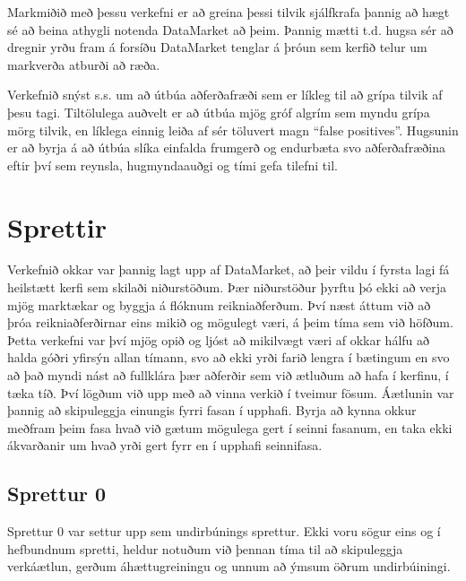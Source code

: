 \documentclass{article}
\begin{document}
Markmiðið með þessu verkefni er að greina þessi tilvik
sjálfkrafa þannig að hægt sé að beina athygli notenda
DataMarket að þeim. Þannig mætti t.d. hugsa sér að
dregnir yrðu fram á forsíðu DataMarket tenglar á þróun
sem kerfið telur um markverða atburði að ræða.

Verkefnið snýst s.s. um að útbúa aðferðafræði sem er
líkleg til að grípa tilvik af þesu tagi. Tiltölulega
auðvelt er að útbúa mjög gróf algrím sem myndu grípa
mörg tilvik, en líklega einnig leiða af sér töluvert
magn “false positives”. Hugsunin er að byrja á að útbúa
slíka einfalda frumgerð og endurbæta svo aðferðafræðina
eftir því sem reynsla, hugmyndaauðgi og tími gefa
tilefni til.

\newpage

\section{Sprettir}
Verkefnið okkar var þannig lagt upp af DataMarket, að þeir vildu í fyrsta lagi fá heilstætt kerfi sem skilaði niðurstöðum. 
Þær niðurstöður þyrftu þó ekki að verja mjög marktækar og byggja á flóknum reikniaðferðum. Því næst áttum við að þróa reikniaðferðirnar eins 
mikið og mögulegt væri, á þeim tíma sem við höfðum. Þetta verkefni var því mjög opið og ljóst að mikilvægt væri 
af okkar hálfu að halda góðri yfirsýn allan tímann, svo að ekki yrði farið lengra í bætingum en svo að það myndi nást að fullklára þær 
aðferðir sem við ætluðum að hafa í kerfinu, í tæka tíð. Því lögðum við upp með að vinna verkið í tveimur fösum. Áætlunin var þannig að skipuleggja
einungis fyrri fasan í upphafi. Byrja að kynna okkur meðfram þeim fasa hvað við gætum mögulega gert í seinni fasanum, en taka ekki ákvarðanir 
um hvað yrði gert fyrr en í upphafi seinnifasa.

\subsection{Sprettur 0}
Sprettur 0 var settur upp sem undirbúnings sprettur. Ekki voru sögur eins og í hefbundnum spretti, heldur notuðum við þennan tíma til að 
skipuleggja verkáætlun, gerðum áhættugreiningu og unnum að ýmsum öðrum undirbúiningi.
\end{document}
